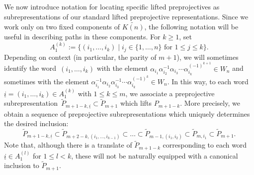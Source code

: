 \documentclass{amsart}
\numberwithin{equation}{section}
\newcommand{\ui}{{\underline i}}
\begin{document}
We now introduce notation for locating specific lifted preprojectives as subrepresentations of our standard lifted preprojective representations.
Since we work only on two fixed components of $\widetilde{K(n)}$, the following notation will be useful in describing paths in these components.
For $k\ge1$, set
\[A_1^{(k)}:=\{(i_1,\ldots,i_k)\mid i_j\in\{1,\ldots,n\}\text{ for $1\le j\le k$}\}.\]%
Depending on context (in particular, the parity of $m+1$), we will sometimes identify the word~$(i_1,\ldots,i_k)$ with the element $\alpha_{i_1}\alpha_{i_2}^{-1}\alpha_{i_3}\cdots\alpha_{i_k}^{(-1)^{k+1}}\in W_n$ and sometimes with the element $\alpha_{i_1}^{-1}\alpha_{i_2}\alpha_{i_3}^{-1}\cdots\alpha_{i_k}^{(-1)^k}\in W_n$.
In this way, to each word $\ui=(i_1,\ldots,i_k)\in A_1^{(k)}$ with $1\leq k\leq m$, we associate a preprojective subrepresentation~$\tilde P_{m+1-k,\ui}\subset\tilde P_{m+1}$ which lifts $P_{m+1-k}$.
More precisely, we obtain a sequence of preprojective subrepresentations which uniquely determines the desired inclusion:
\[\tilde P_{m+1-k,\ui}\subset\tilde P_{m+2-k,(i_1,\ldots,i_{k-1})}\subset\ldots\subset\tilde P_{m-1,(i_1,i_2)}\subset\tilde P_{m,i_1}\subset\tilde P_{m+1}.\]
Note that, although there is a translate of $\tilde P_{m+1-k}$ corresponding to each word $\ui\in A_1^{(l)}$ for $1\le l<k$, these will not be naturally equipped with a canonical inclusion to $\tilde P_{m+1}$.
\end{document}
